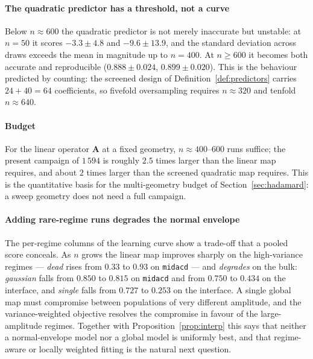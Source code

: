 \documentclass[11pt,a4paper]{article}
\newcommand{\vect}[1]{\mathbf{#1}}
\theoremstyle{plain}
\theoremstyle{definition}
\theoremstyle{remark}
\begin{document}
\label{meas:threshold}
\paragraph{The quadratic predictor has a threshold, not a curve}
Below $n \approx 600$ the quadratic predictor is not merely inaccurate but
unstable: at $n=50$ it scores $-3.3 \pm 4.8$ and $-9.6 \pm 13.9$, and the
standard deviation across draws exceeds the mean in magnitude up to $n=400$. At
$n \ge 600$ it becomes both accurate and reproducible ($0.888 \pm 0.024$,
$0.899 \pm 0.020$). This is the behaviour predicted by counting: the screened
design of Definition~\ref{def:predictors} carries $24+40 = 64$ coefficients, so
fivefold oversampling requires $n \approx 320$ and tenfold $n \approx 640$.

\label{cor:budget}
\paragraph{Budget}
For the linear operator $\vect{A}$ at a fixed geometry, $n \approx 400$--$600$
runs suffice; the present campaign of $1\,594$ is roughly $2.5$ times larger
than the linear map requires, and about $2$ times larger than the screened
quadratic map requires. This is the quantitative basis for the multi-geometry
budget of Section~\ref{sec:hadamard}: a sweep geometry does not need a full
campaign.

\label{rem:tradeoff}
\paragraph{Adding rare-regime runs degrades the normal envelope}
The per-regime columns of the learning curve show a trade-off that a pooled
score conceals. As $n$ grows the linear map improves sharply on the
high-variance regimes --- \textit{dead} rises from $0.33$ to $0.93$ on
\texttt{midacd} --- and \emph{degrades} on the bulk: \textit{gaussian} falls
from $0.850$ to $0.815$ on \texttt{midacd} and from $0.750$ to $0.434$ on the
interface, and \textit{single} falls from $0.727$ to $0.253$ on the interface. A
single global map must compromise between populations of very different
amplitude, and the variance-weighted objective resolves the compromise in favour
of the large-amplitude regimes. Together with
Proposition~\ref{prop:interp} this says that neither a normal-envelope model
nor a global model is uniformly best, and that regime-aware or locally weighted
fitting is the natural next question.

\end{document}

